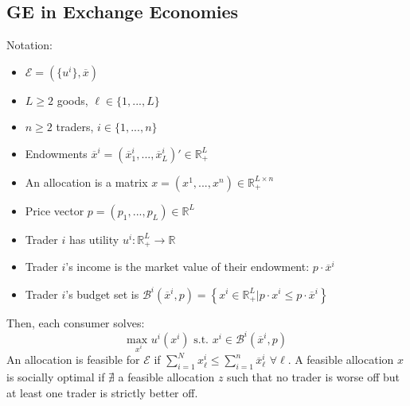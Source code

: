 \documentclass{article}
\newcommand{\R}{\mathbb{R}}
\newcommand{\usmax}[1]{\underset{#1}{\text{max }}}
\newcommand{\olx}{\overline{x}}
\newcommand{\B}{\mathcal{B}}
\newcommand{\Epsilon}{\mathcal{E}}
\newcommand{\blue}[1]{{\color{blue}#1}}
\newcommand{\sumn}{\sum_{i=1}^n}
\begin{document}
\subsection{GE in Exchange Economies}
Notation:
\begin{itemize}
	\item $\Epsilon = (\{u^i\},\overline{x})$
	\item $L\geq 2$ goods, $\ell\in\{1,...,L\}$
	\item $n\geq 2$ traders, $i\in\{1,...,n\}$
	\item Endowments $\overline{x}^i=(\olx_1^i,...,\olx_L^i)'\in\R_+^L$ 
	\item An allocation is a matrix $x=(x^1,...,x^n)\in\R_+^{L\times n}$
	\item Price vector $p=(p_1,...,p_L)\in\R^L$
	\item Trader $i$ has utility $u^i:\R_+^L\rightarrow\R$
	\item Trader $i$'s income is the market value of their endowment: $p\cdot \olx^i$
	\item Trader $i$'s budget set is $\B^i(\olx^i,p) = \left\{x^i\in\R_+^L|p\cdot x^i\leq p\cdot\olx^i\right\}$
\end{itemize}
Then, each consumer solves:
\[
	\usmax{x^i}u^i(x^i)\text{ s.t. }x^i\in\B^i(\olx^i,p)
\]
An allocation is \blue{feasible} for $\Epsilon$ if $\sum_{i=1}^Nx_\ell^i\leq\sumn \olx_\ell^i$ $\forall \ell$. A feasible allocation $x$ is \blue{socially optimal} if $\nexists$ a feasible allocation $z$ such that no trader is worse off but at least one trader is strictly better off.

\pagebreak
\end{document}
